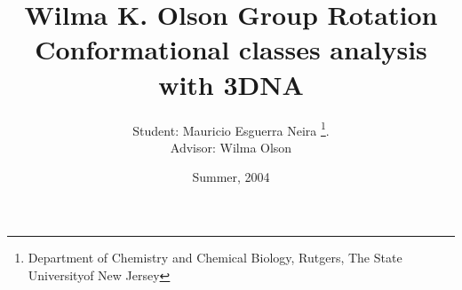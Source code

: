 \documentclass[12pt]{article}
\title{Wilma K. Olson Group Rotation \\
       \bigskip \bigskip
       Conformational classes analysis with 3DNA
\bigskip \bigskip \bigskip \bigskip \bigskip \bigskip \bigskip \bigskip \bigskip \bigskip \bigskip \bigskip }
\date{\bigskip \bigskip
\bigskip\bigskip\bigskip\bigskip\bigskip Summer, 2004}
\author{Student: Mauricio Esguerra Neira \bigskip\bigskip\bigskip\bigskip\bigskip\bigskip\bigskip\bigskip\bigskip\bigskip \bigskip \thanks{Department of Chemistry and Chemical Biology, Rutgers, The State Universityof New Jersey}.\\ Advisor: Wilma Olson}
\begin{document}
\maketitle
%

\pagebreak



%

%

%

%


\end{document}
